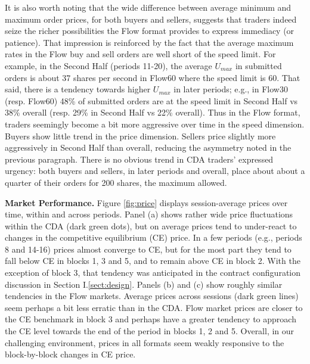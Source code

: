 \documentclass[12pt]{article}
\begin{document}
It is also worth noting that the wide difference between average minimum and maximum order prices, for both buyers and sellers, suggests that traders indeed seize the richer possibilities the Flow format provides to express immediacy (or patience). 
That impression is reinforced by the fact that the average maximum rates in the Flow buy and sell orders are well short of the speed limit. 
For example, in the Second Half (periods 11-20), the average $U_{max}$ in submitted orders is about 37 shares per second in Flow60 where the speed limit is 60. 
That said, there is a tendency towards higher $U_{max}$ in later periods;
e.g., in Flow30 (resp. Flow60) 48\% of submitted orders are at the speed limit in Second Half vs 38\% overall (resp. 29\% in Second Half vs 22\% overall).
Thus in the Flow format, traders seemingly become a bit more aggressive over time in the speed dimension. Buyers show little trend in the price dimension.
Sellers price slightly more aggressively in Second Half than overall,
reducing the asymmetry noted in the previous paragraph.
There is no obvious trend in CDA traders' expressed urgency: both buyers and sellers, in later periods and overall, place about about a quarter of their orders for 200 shares, the maximum allowed.

\vspace{0.5cm}
\noindent \textbf{Market Performance.} 
Figure \ref{fig:price} displays session-average prices over time, within and across periods. Panel (a)
shows rather wide price fluctuations within the CDA (dark green dots), but on average  prices tend to under-react to changes in the competitive equilibrium (CE) price. 
In a few periods (e.g., periods 8 and 14-16) prices almost converge to CE, but for the most part they tend to fall below CE in blocks 1, 3 and 5, and to remain above CE in block 2. 
With the exception of block 3, that tendency was anticipated in the contract configuration discussion in Section I.\ref{sect:design}.
Panels (b) and (c) show roughly similar tendencies in the Flow markets. 
Average prices across sessions (dark green lines) seem perhaps a bit less erratic than in the CDA.
Flow market prices are closer to the CE benchmark in block 3 
and perhaps have a greater tendency to approach the CE level towards the end of the period in blocks 1, 2 and 5. 
Overall, in our challenging environment, 
prices in all formats seem weakly responsive to the block-by-block changes in CE price. 
\end{document}
